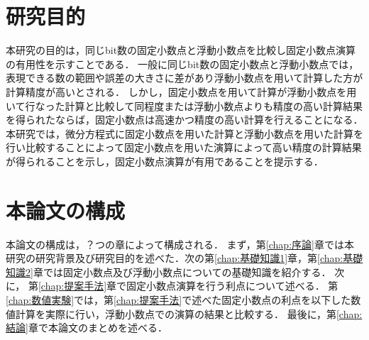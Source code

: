 \section{研究目的}
本研究の目的は，同じbit数の固定小数点と浮動小数点を比較し固定小数点演算の有用性を示すことである．
一般に同じbit数の固定小数点と浮動小数点では，表現できる数の範囲や誤差の大きさに差があり浮動小数点を用いて計算した方が計算精度が高いとされる．
しかし，固定小数点を用いて計算が浮動小数点を用いて行なった計算と比較して同程度または浮動小数点よりも精度の高い計算結果を得られたならば，固定小数点は高速かつ精度の高い計算を行えることになる．
本研究では，微分方程式に固定小数点を用いた計算と浮動小数点を用いた計算を行い比較することによって固定小数点を用いた演算によって高い精度の計算結果が得られることを示し，固定小数点演算が有用であることを提示する．


\section{本論文の構成}
本論文の構成は，？つの章によって構成される．
まず，第\ref{chap:序論}章では本研究の研究背景及び研究目的を述べた．次の第\ref{chap:基礎知識1}章，第\ref{chap:基礎知識2}章では固定小数点及び浮動小数点についての基礎知識を紹介する．
次に， 第\ref{chap:提案手法}章で固定小数点演算を行う利点について述べる．
第\ref{chap:数値実験}では，第\ref{chap:提案手法}で述べた固定小数点の利点を以下した数値計算を実際に行い，浮動小数点での演算の結果と比較する．
最後に，第\ref{chap:結論}章で本論文のまとめを述べる．
